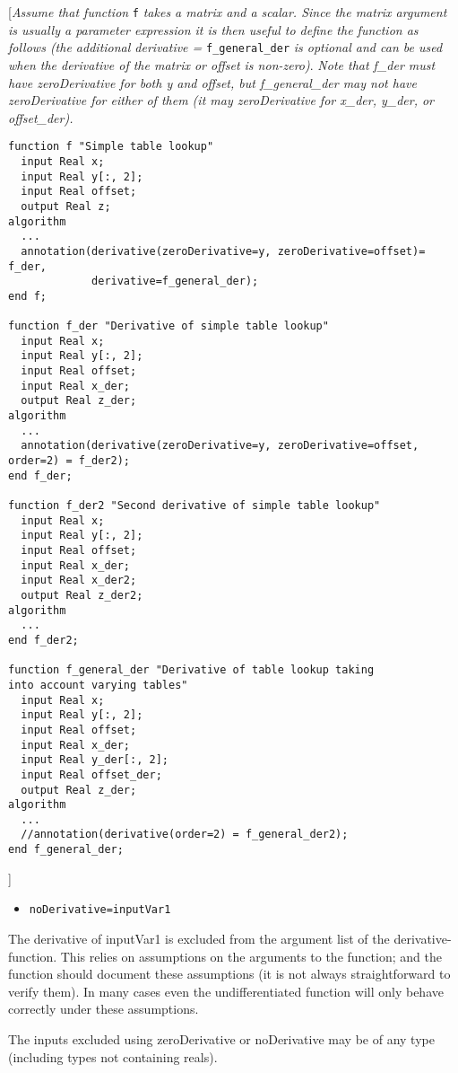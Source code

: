 {[}\emph{Assume that function} \lstinline!f! \emph{takes a matrix and a scalar.
Since the matrix argument is usually a parameter expression it is then
useful to define the function as follows (the additional derivative =}
\lstinline!f_general_der! \emph{is optional and can be used when the derivative of
the matrix or offset is non-zero)}. \emph{Note that f\_der must have
zeroDerivative for both y and offset, but f\_general\_der may not have
zeroDerivative for either of them (it may zeroDerivative for x\_der,
y\_der, or offset\_der).}

\begin{lstlisting}[language=modelica]
function f "Simple table lookup"
  input Real x;
  input Real y[:, 2];
  input Real offset;
  output Real z;
algorithm
  ...
  annotation(derivative(zeroDerivative=y, zeroDerivative=offset)= f_der,
             derivative=f_general_der);
end f;

function f_der "Derivative of simple table lookup"
  input Real x;
  input Real y[:, 2];
  input Real offset;
  input Real x_der;
  output Real z_der;
algorithm
  ...
  annotation(derivative(zeroDerivative=y, zeroDerivative=offset, order=2) = f_der2);
end f_der;

function f_der2 "Second derivative of simple table lookup"
  input Real x;
  input Real y[:, 2];
  input Real offset;
  input Real x_der;
  input Real x_der2;
  output Real z_der2;
algorithm
  ...
end f_der2;

function f_general_der "Derivative of table lookup taking
into account varying tables"
  input Real x;
  input Real y[:, 2];
  input Real offset;
  input Real x_der;
  input Real y_der[:, 2];
  input Real offset_der;
  output Real z_der;
algorithm
  ...
  //annotation(derivative(order=2) = f_general_der2);
end f_general_der;
\end{lstlisting}
{]}

\begin{itemize}
\item
  \lstinline!noDerivative=inputVar1!
\end{itemize}

The derivative of inputVar1 is excluded from the argument list of the
derivative-function. This relies on assumptions on the arguments to the
function; and the function should document these assumptions (it is not
always straightforward to verify them). In many cases even the
undifferentiated function will only behave correctly under these
assumptions.

The inputs excluded using zeroDerivative or noDerivative may be of any
type (including types not containing reals).

